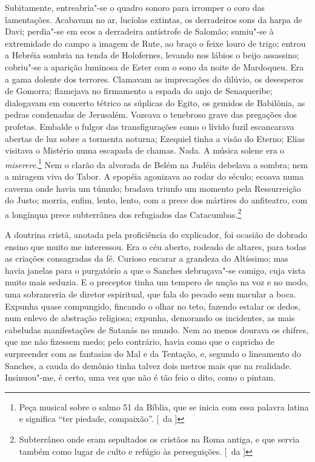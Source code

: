 Subitamente, entreabria"-se o quadro sonoro para
irromper o coro das lamentações. Acabavam no ar, lucíolas extintas, os
derradeiros sons da harpa de Davi; perdia"-se em ecos a derradeira
antístrofe de Salomão; sumiu"-se à extremidade do campo a imagem de
Rute, ao braço o feixe louro de trigo; entrou a Hebréia sombria na
tenda de Holofernes, levando nos lábios o beijo assassino; cobriu"-se
a aparição luminosa de Ester com o sono da noite de Mardoqueu. Era a
gama dolente dos terrores. Clamavam as imprecações do dilúvio, os
desesperos de Gomorra; flamejava no firmamento a espada do anjo de
Senaqueribe; dialogavam em concerto tétrico as súplicas do Egito, os
gemidos de Babilônia, as pedras condenadas de Jerusalém. Vozeava o
tenebroso grave das pregações dos profetas. Embalde o fulgor das
transfigurações como o lívido fuzil escancarava abertas de luz sobre a
tormenta noturna; Ezequiel tinha a visão do Eterno; Elias visitava o
Mistério numa escapada de chamas. Nada. A música solene era o 
\textit{miserere}.\footnote{ Peça musical sobre o salmo 51 da Bíblia, 
que se inicia com essa palavra latina e significa ``ter piedade, compaixão''. [~da ]}
Nem o clarão da alvorada de Belém na Judéia debelava a sombra; nem a
miragem viva do Tabor. A epopéia agonizava ao rodar do século; ecoava
numa caverna onde havia um túmulo; bradava triunfo um momento pela
Ressurreição do Justo; morria, enfim, lento, lento, com a prece dos
mártires do anfiteatro, com a longínqua prece subterrânea dos
refugiados das Catacumbas.\footnote{ Subterrâneo onde eram sepultados os cristãos na Roma antiga, 
e que servia também como lugar de culto e refúgio às perseguições. [~da ]} 

A doutrina cristã, anotada pela proficiência
do explicador, foi ocasião de dobrado ensino que muito me interessou.
Era o céu aberto, rodeado de altares, para todas as criações
consagradas da fé. Curioso encarar a grandeza do Altíssimo; mas havia
janelas para o purgatório a que o Sanches debruçava"-se comigo, cuja
vista muito mais seduzia. E o preceptor tinha um tempero de unção na
voz e no modo, uma sobranceria de diretor espiritual, que fala do
pecado sem macular a boca. Expunha quase compungido, fincando o olhar
no teto, fazendo estalar os dedos, num enlevo de abstração religiosa;
expunha, demorando os incidentes, as mais cabeludas manifestações de
Satanás no mundo. Nem ao menos dourava os chifres, que me não fizessem
medo; pelo contrário, havia como que o capricho de surpreender com as
fantasias do Mal e da Tentação, e, segundo o lineamento do Sanches, a
cauda do demônio tinha talvez dois metros mais que na realidade.
Insinuou"-me, é certo, uma vez que não é tão feio o dito, como o
pintam. 

